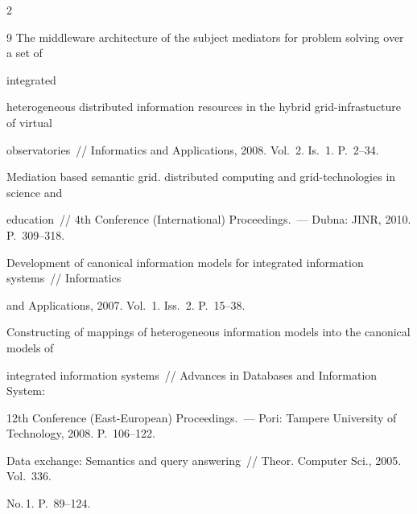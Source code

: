 \begin{multicols}{2}
{{\begin{thebibliography}{9}
The middleware architecture of the subject mediators for problem solving over a set of 

integrated 

heterogeneous distributed information resources in the hybrid grid-infrastucture of virtual 

observatories~// Informatics and Applications, 2008.  Vol.~2. Is.~1. P.~2--34.





Mediation based semantic grid. distributed computing and grid-technologies in science and 

education~// 4th  Conference (International) Proceedings.~--- Dubna: JINR, 2010.  P.~309--318.





Development of canonical information models for integrated information systems~// Informatics 

and Applications, 2007.  Vol.~1. Iss.~2. P.~15--38.





Constructing of mappings of heterogeneous information models into the canonical models of 

integrated information systems~// Advances in Databases and Information System:  

12th  Conference (East-European) Proceedings.~--- Pori: Tampere University of Technology, 2008.  P.~106--122.





Data exchange: Semantics and query answering~// Theor. Computer Sci., 2005.  Vol.~336. 

No.\,1. P.~89--124.



 \end{thebibliography}

}

}





\end{multicols}



